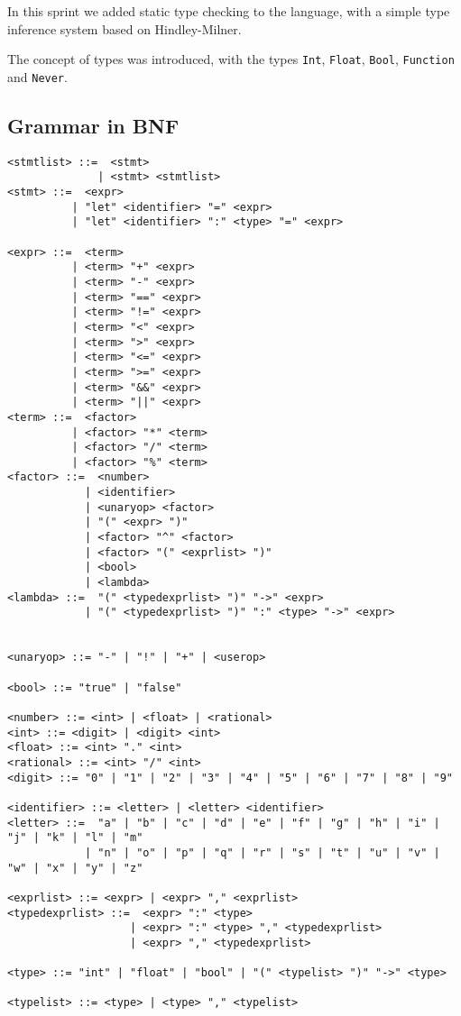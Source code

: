 In this sprint we added static type checking to the language, with a simple type inference system based on 
Hindley-Milner.

The concept of types was introduced, with the types \texttt{Int}, \texttt{Float}, \texttt{Bool}, \texttt{Function} and
\texttt{Never}.

\subsection{Grammar in BNF}\label{subsec:grammar-in-bnf5}

\begin{verbatim}
<stmtlist> ::=  <stmt> 
              | <stmt> <stmtlist>
<stmt> ::=  <expr> 
          | "let" <identifier> "=" <expr>
          | "let" <identifier> ":" <type> "=" <expr>

<expr> ::=  <term> 
          | <term> "+" <expr> 
          | <term> "-" <expr>
          | <term> "==" <expr>
          | <term> "!=" <expr>
          | <term> "<" <expr>
          | <term> ">" <expr>
          | <term> "<=" <expr>
          | <term> ">=" <expr>
          | <term> "&&" <expr>
          | <term> "||" <expr>
<term> ::=  <factor> 
          | <factor> "*" <term> 
          | <factor> "/" <term> 
          | <factor> "%" <term> 
<factor> ::=  <number> 
            | <identifier> 
            | <unaryop> <factor>
            | "(" <expr> ")" 
            | <factor> "^" <factor>
            | <factor> "(" <exprlist> ")"
            | <bool>
            | <lambda>
<lambda> ::=  "(" <typedexprlist> ")" "->" <expr>
            | "(" <typedexprlist> ")" ":" <type> "->" <expr>


<unaryop> ::= "-" | "!" | "+" | <userop>

<bool> ::= "true" | "false"
            
<number> ::= <int> | <float> | <rational>
<int> ::= <digit> | <digit> <int>
<float> ::= <int> "." <int>
<rational> ::= <int> "/" <int>
<digit> ::= "0" | "1" | "2" | "3" | "4" | "5" | "6" | "7" | "8" | "9"

<identifier> ::= <letter> | <letter> <identifier>
<letter> ::=  "a" | "b" | "c" | "d" | "e" | "f" | "g" | "h" | "i" | "j" | "k" | "l" | "m" 
            | "n" | "o" | "p" | "q" | "r" | "s" | "t" | "u" | "v" | "w" | "x" | "y" | "z"
            
<exprlist> ::= <expr> | <expr> "," <exprlist>
<typedexprlist> ::=  <expr> ":" <type> 
                   | <expr> ":" <type> "," <typedexprlist>
                   | <expr> "," <typedexprlist>
    
<type> ::= "int" | "float" | "bool" | "(" <typelist> ")" "->" <type>

<typelist> ::= <type> | <type> "," <typelist>
\end{verbatim}

